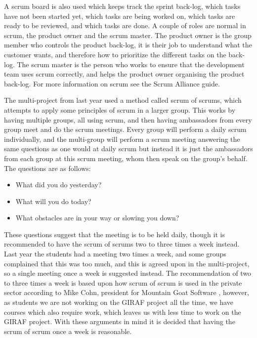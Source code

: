 A scrum board is also used which keeps track the sprint back-log, which tasks have not been started yet, which tasks are being worked on, which tasks are ready to be reviewed, and which tasks are done.
A couple of roles are normal in scrum, the product owner and the scrum master.
The product owner is the group member who controls the product back-log, it is their job to understand what the customer wants, and therefore how to prioritize the different tasks on the back-log.
The scrum master is the person who works to ensure that the development team uses scrum correctly, and helps the product owner organising the product back-log.
For more information on scrum see the Scrum Alliance guide. \cite{scrum}

\bigskip
The multi-project from last year used a method called scrum of scrums, which attempts to apply some principles of scrum in a larger group.
This works by having multiple groups, all using scrum, and then having ambassadors from every group meet and do the scrum meetings. 
Every group will perform a daily scrum individually, and the multi-group will perform a scrum meeting answering the same questions as one would at daily scrum but instead it is just the ambassadors from each group at this scrum meeting, whom then speak on the group's behalf.
The questions are as follows:

\begin{itemize}
	\item What did you do yesterday? 
	\item What will you do today?
	\item What obstacles are in your way or slowing you down?
\end{itemize}

These questions suggest that the meeting is to be held daily, though it is recommended to have the scrum of scrums two to three times a week instead. 
Last year the students had a meeting two times a week, and some groups complained that this was too much, and this is agreed upon in the multi-project, so a single meeting once a week is suggested instead.
The recommendation of two to three times a week is based upon how scrum of scrum is used in the private sector according to Mike Cohn, president for Mountain Goat Software \citep{SCRUMoSCRUM}, however, as students we are not working on the GIRAF project all the time, we have courses which also require work, which leaves us with less time to work on the GIRAF project. 
With these arguments in mind it is decided that having the scrum of scrum once a week is reasonable.

